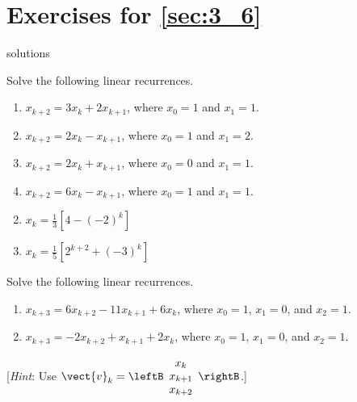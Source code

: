 \section*{Exercises for \ref{sec:3_6}}

\begin{Filesave}{solutions}
\end{Filesave}

\begin{multicols}{2}
\begin{ex}
Solve the following linear recurrences.

\begin{enumerate}[label={\alph*.}]
\item $x_{k+2} = 3x_{k} + 2x_{k+1}$, where $x_{0} = 1$ and $x_{1} = 1$.
\item $x_{k+2} = 2x_{k} - x_{k+1}$, where $x_{0} = 1$ and $x_{1} = 2$.
\item $x_{k+2} = 2x_{k} + x_{k+1}$, where $x_{0} = 0$ and $x_{1} = 1$.
\item $x_{k+2} = 6x_{k} - x_{k+1}$, where $x_{0} = 1$ and $x_{1} = 1$.
\end{enumerate}
\begin{sol}
\begin{enumerate}[label={\alph*.}]
\setcounter{enumi}{1}
\item  $x_k = \frac{1}{3} \left[ 4 - (-2)^k \right]$

\setcounter{enumi}{3}
\item  $x_k = \frac{1}{5} \left[ 2^{k+2} + (-3)^k \right]$

\end{enumerate}
\end{sol}
\end{ex}

\begin{ex}
Solve the following linear recurrences.

\begin{enumerate}[label={\alph*.}]
\item $x_{k+3} = 6x_{k+2} - 11x_{k+1} + 6x_{k}$, where $x_{0} = 1$, $x_{1} = 0$, and $x_{2} = 1$.

\item $x_{k+3} = -2x_{k+2} + x_{k+1} + 2x_{k}$, where $x_{0} = 1$, $x_{1} = 0$, and $x_{2} = 1$.

\end{enumerate}
[\textit{Hint}: Use $\vect{v}_k = \leftB \begin{array}{c}
x_k \\
x_{k+1}\\
x_{k+2}
\end{array}\rightB$.]



\end{ex}
\end{multicols}
